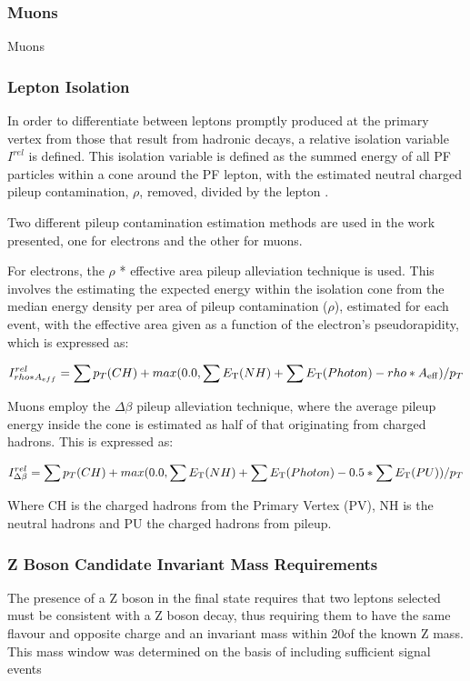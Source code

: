 \subsubsection{Muons}
Muons


\cite{Chatrchyan:2012xi}


\subsubsection{Lepton Isolation}
In order to differentiate between leptons promptly produced at the primary vertex from those that result from hadronic decays, a relative isolation variable $I^{rel}$ is defined.
This isolation variable is defined as the summed energy of all PF particles within a cone around the PF lepton, with the estimated neutral charged pileup contamination, $\rho$, removed, divided by the lepton \pT.

Two different pileup contamination estimation methods are used in the work presented, one for electrons and the other for muons.

For electrons, the $\rho$ * effective area pileup alleviation technique is used.
This involves the estimating the expected energy within the isolation cone from the median energy density per area of pileup contamination ($\rho$), estimated for each event, with the effective area given as a function of the electron's pseudorapidity, which is expressed as: 

\begin{equation}
I^{rel}_{rho * A_{eff}} = \sum p_T(CH) + max (0.0, \sum E_{\rm T}(NH) + \sum E_{\rm T}(Photon) -rho*A_{\rm eff} )/p_T \\
\end{equation}\label{eq:rhoEffA}

Muons employ the $\Delta\beta$ pileup alleviation technique, where the average pileup energy inside the cone is estimated as half of that originating from charged hadrons.
This is expressed as:

\begin{equation}
I^{rel}_{\Delta\beta} = \sum p_T(CH) + max (0.0, \sum E_{\rm T}(NH) + \sum E_{\rm T}(Photon) - 0.5 * \sum E_{\rm T}(PU))/p_T \\
\end{equation}\label{eq:deltaBeta}

Where CH is the charged hadrons from the Primary Vertex (PV), NH is the neutral hadrons and PU the charged hadrons from pileup.

\subsubsection{Z Boson Candidate Invariant Mass Requirements}
The presence of a Z boson in the final state requires that two leptons selected must be consistent with a Z boson decay, thus requiring them to have the same flavour and opposite charge and an invariant mass within 20\GeVcc of the known Z mass.
This mass window was determined on the basis of including sufficient signal events 

